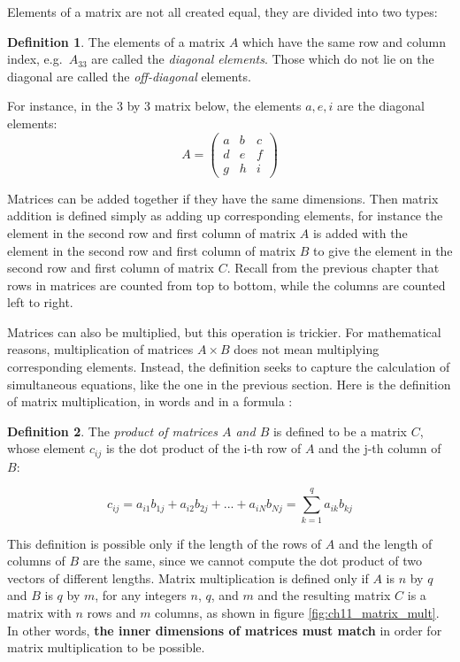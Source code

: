\documentclass[
]{book}
\theoremstyle{definition}
\newtheorem{definition}{Definition}[chapter]
\theoremstyle{definition}
\theoremstyle{definition}
\theoremstyle{remark}
\begin{document}
Elements of a matrix are not all created equal, they are divided into two types:

\begin{definition}
\protect\hypertarget{def:def-mat-els}{}{\label{def:def-mat-els} }The elements of a matrix \(A\) which have the same row and column index, e.g.~\(A_{33}\) are called the \emph{diagonal elements}. Those which do not lie on the diagonal are called the \emph{off-diagonal} elements.
\end{definition}

For instance, in the 3 by 3 matrix below, the elements \(a, e, i\) are the diagonal elements:
\[
A = \left(\begin{array}{ccc}a & b & c \\d & e & f \\g & h & i\end{array}\right)
\]

Matrices can be added together if they have the same dimensions. Then matrix addition is defined simply as adding up corresponding elements, for instance the element in the second row and first column of matrix \(A\) is added with the element in the second row and first column of matrix \(B\) to give the element in the second row and first column of matrix \(C\). Recall from the previous chapter that rows in matrices are counted from top to bottom, while the columns are counted left to right.

Matrices can also be multiplied, but this operation is trickier. For mathematical reasons, multiplication of matrices \(A \times B\) does not mean multiplying corresponding elements. Instead, the definition seeks to capture the calculation of simultaneous equations, like the one in the previous section. Here is the definition of matrix multiplication, in words and in a formula \citep{strang_linear_2005}:

\begin{definition}
\protect\hypertarget{def:def-mat-mult}{}{\label{def:def-mat-mult} }The \emph{product of matrices \(A\) and \(B\)} is defined to be a matrix \(C\), whose element \(c_{ij}\) is the dot product of the i-th row of \(A\) and the j-th column of \(B\):

\[ 
c_{ij} = a_{i1}b_{1j} + a_{i2}b_{2j} + ... + a_{iN}b_{Nj} = \sum_{k=1}^q a_{ik} b_{kj}
\]
\end{definition}
This definition is possible only if the length of the rows of \(A\) and the length of columns of \(B\) are the same, since we cannot compute the dot product of two vectors of different lengths. Matrix multiplication is defined only if \(A\) is \(n\) by \(q\) and \(B\) is \(q\) by \(m\), for any integers \(n\), \(q\), and \(m\) and the resulting matrix \(C\) is a matrix with \(n\) rows and \(m\) columns, as shown in figure \ref{fig:ch11_matrix_mult}. In other words, \textbf{the inner dimensions of matrices must match} in order for matrix multiplication to be possible.
\end{document}
